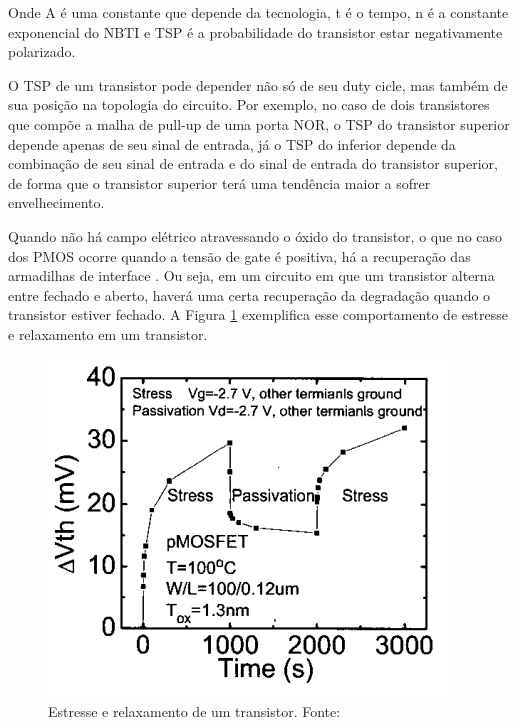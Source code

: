 Onde A é uma constante que depende da tecnologia, t é o tempo, n é a constante exponencial do NBTI e TSP é a probabilidade do transistor estar negativamente polarizado.

O TSP de um transistor pode depender não só de seu duty cicle, mas também de sua posição na topologia do circuito. Por exemplo, no caso de dois transistores que compõe a malha de pull-up de uma porta NOR, o TSP do transistor superior depende apenas de seu sinal de entrada, já o TSP do inferior depende da combinação de seu sinal de entrada e do sinal de entrada do transistor superior, de forma que o transistor superior terá uma tendência maior a sofrer envelhecimento.

Quando não há campo elétrico atravessando o óxido do transistor, o que no caso dos PMOS ocorre quando a tensão de gate é positiva, há a recuperação das armadilhas de interface \cite{Chen}. Ou seja, em um circuito em que um transistor alterna entre fechado e aberto, haverá uma certa recuperação da degradação quando o transistor estiver fechado. A Figura \ref{fig:recover} exemplifica esse comportamento de estresse e relaxamento em um transistor.

\begin{figure}[H]
    \centering
    \includegraphics[scale=0.8]{figures/ReferencialTeorico/Recover.png}
    \caption{Estresse e relaxamento de um transistor. Fonte: \cite{Chen}}
    \label{fig:recover}
\end{figure}
